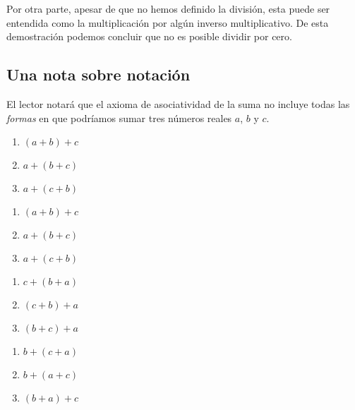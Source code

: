 \documentclass[11pt]{article}
\begin{document}
\begin{enumerate}[label=\alph*)]
    Por otra parte, apesar de que no hemos definido la división, esta puede ser entendida como la multiplicación por algún inverso multiplicativo. De esta demostración podemos concluir que no es posible dividir por cero.

\end{enumerate}

\pagebreak

    \subsection*{Una nota sobre notación}

    El lector notará que el axioma de asociatividad de la suma no incluye todas las \textit{formas} en que podríamos sumar tres números reales $a$, $b$ y $c$.
\begin{center}
    \begin{minipage}[c]{.2\linewidth}
        \begin{enumerate}[label=\roman*.]
            \item $(a+b)+c$
            \item $a+(b+c)$
            \item $a+(c+b)$
        \end{enumerate}
        \end{minipage}%
        \begin{minipage}[c]{.2\linewidth}
            \begin{enumerate}[start=4,label=\roman*.]
                \item $(a+b)+c$
                \item $a+(b+c)$
                \item $a+(c+b)$
            \end{enumerate}
            \end{minipage}%
        \begin{minipage}[c]{.2\linewidth}
            \begin{enumerate}[start=7,label=\roman*.]
            \item $c+(b+a)$
            \item $(c+b)+a$
            \item $(b+c)+a$
        \end{enumerate}
        \end{minipage}
        \begin{minipage}[c]{.2\linewidth}
            \begin{enumerate}[start=10,label=\roman*.]
            \item $b+(c+a)$
            \item $b+(a+c)$
            \item $(b+a)+c$
        \end{enumerate}
        \end{minipage}
\end{center}
\end{document}
